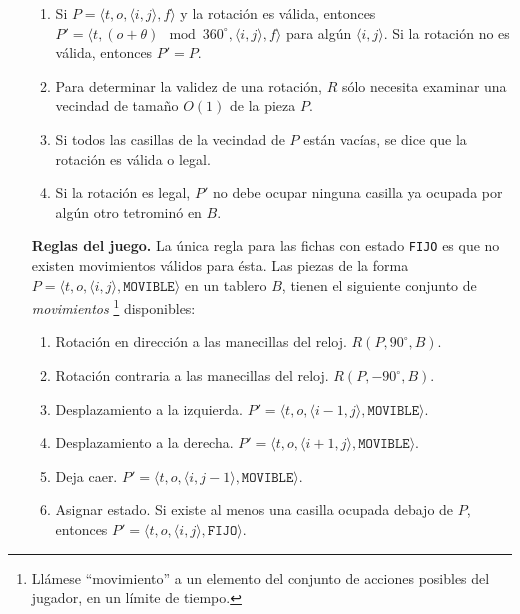 \begin{itemize}[leftmargin=0.5cm,align=left]
\begin{enumerate}
\item Si $P = \langle t, o, \langle i,j \rangle, f\rangle$ y la rotación es válida,
entonces $P' = \langle t, (o + \theta) \mod 360^{\circ}, \langle i,j \rangle, f\rangle$
para algún $\langle i,j \rangle$. Si la rotación no es válida, entonces $P' = P$.

\item Para determinar la validez de una rotación, $R$ sólo necesita examinar
una vecindad de tamaño $O(1)$ de la pieza $P$.

\item Si todos las casillas de la vecindad de $P$ están vacías, se dice que la
rotación es válida o legal.

\item Si la rotación es legal, $P'$ no debe ocupar ninguna casilla ya ocupada
por algún otro tetrominó en $B$.

\end{enumerate}

\item[\textbf{Reglas del juego. }] La única regla para las fichas con estado
\texttt{FIJO} es que no existen movimientos válidos para ésta. Las piezas de
la forma $P = \langle t, o, \langle i,j \rangle, \texttt{MOVIBLE}\rangle$ en un
tablero $B$, tienen el siguiente conjunto de \textit{movimientos}
\footnote{Llámese ``movimiento'' a un elemento del conjunto de acciones posibles 
del jugador, en un límite de tiempo.} disponibles:

\begin{enumerate}
\item Rotación en dirección a las manecillas del reloj. $R(P, 90^{\circ}, B)$.

\item Rotación contraria a las manecillas del reloj. $R(P, -90^{\circ}, B)$.

\item Desplazamiento a la izquierda.
$P' = \langle t, o, \langle i - 1,j \rangle, \texttt{MOVIBLE}\rangle$.

\item Desplazamiento a la derecha.
$P' = \langle t, o, \langle i + 1,j \rangle, \texttt{MOVIBLE}\rangle$.

\item Deja caer. $P' = \langle t, o, \langle i,j - 1 \rangle, \texttt{MOVIBLE}\rangle$.

\item Asignar estado. Si existe al menos una casilla ocupada debajo de $P$,
entonces $P' = \langle t, o, \langle i,j \rangle, \texttt{FIJO}\rangle$.
\end{enumerate}


\end{itemize}
